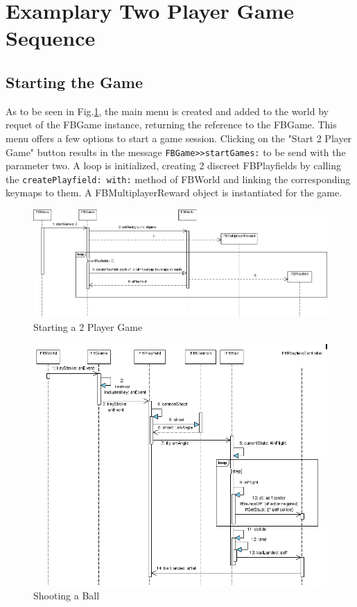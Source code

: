 \section{Examplary Two Player Game Sequence}
\subsection{Starting the Game}
As to be seen in Fig.\ref{fig:Starting2PlayerGame}, the main menu is created 
and added to the world by requet of the FBGame instance, returning the reference 
to the FBGame. This menu offers a few options to start a game session. Clicking 
on the "Start 2 Player Game" button results in the message 
\lstinline!FBGame>>startGames:! to be send with the parameter two. A loop is 
initialized, creating 2 discreet FBPlayfields by calling the 
\lstinline!createPlayfield: with:! method of FBWorld and linking the corresponding 
keymaps to them. A FBMultiplayerReward object is instantiated for the game.
%
\begin{figure}[bt]
  \begin{center}
    \includegraphics[width=\linewidth]{images/Starting2PlayerGame.png}
  \end{center}
  \caption{Starting a 2 Player Game}
  \label{fig:Starting2PlayerGame}
\end{figure}
%
%
\begin{figure}[bt]
  \begin{center}
    \includegraphics[width=\linewidth]{images/ShootingABall.png}
  \end{center}
  \caption{Shooting a Ball}
  \label{fig:ShootingABall}
\end{figure}
